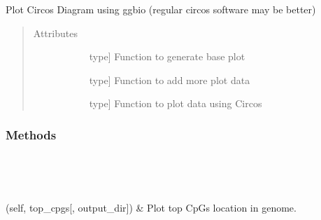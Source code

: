 \documentclass[letterpaper,10pt,english]{sphinxmanual}
\begin{document}
\begin{fulllineitems}
\label{\detokenize{index:methylnet.interpretation_classes.PlotCircos}}
Plot Circos Diagram using ggbio (regular circos software may be better)
\begin{quote}\begin{description}
\item[{Attributes}] \leavevmode\begin{description}
\item[{}] \leavevmode{[}type{]}
Function to generate base plot

\item[{}] \leavevmode{[}type{]}
Function to add more plot data

\item[{}] \leavevmode{[}type{]}
Function to plot data using Circos

\end{description}

\end{description}\end{quote}
\subsubsection*{Methods}


\begin{savenotes}\sphinxatlongtablestart\begin{longtable}{}
\hline

\endfirsthead

%
{}\\
\hline

\endhead

\hline
{}\\
\endfoot

\endlastfoot

{\hyperref[\detokenize{index:methylnet.interpretation_classes.PlotCircos.plot_cpgs}]{}}(self, top\_cpgs{[}, output\_dir{]})
&
Plot top CpGs location in genome.
\\
\hline
\end{longtable}\sphinxatlongtableend\end{savenotes}


\end{fulllineitems}
\end{document}
